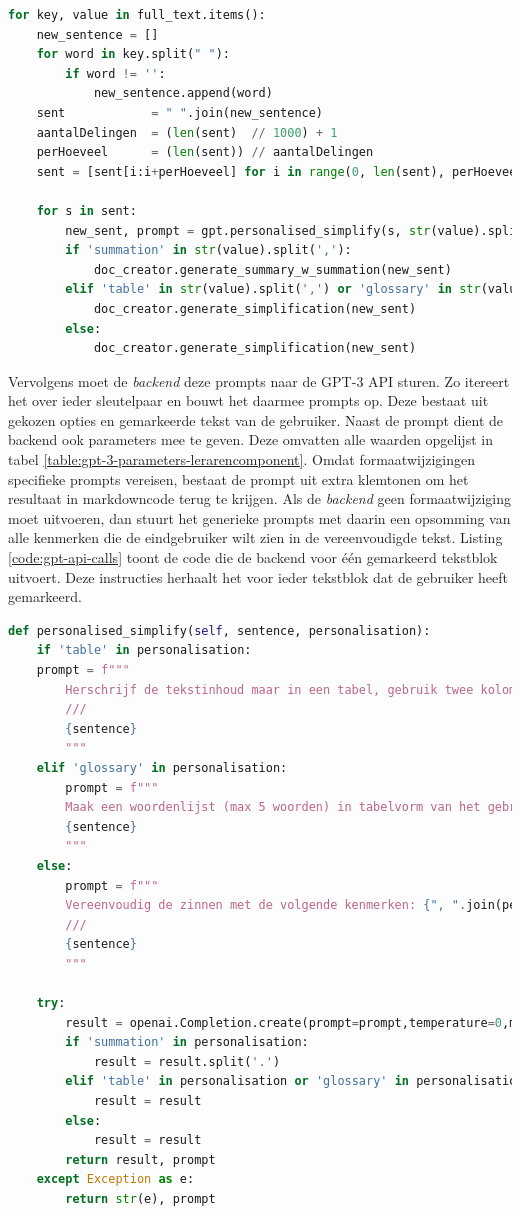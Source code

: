 \begin{lstlisting}[language=Python, caption={Alle gemarkeerde tekstblokken uit de localstorage aflopen en doorsturen naar het markdown document.}, label={code:localstorage-iteration}]
for key, value in full_text.items():
	new_sentence = []
	for word in key.split(" "):
		if word != '':
			new_sentence.append(word)
	sent            = " ".join(new_sentence)
	aantalDelingen  = (len(sent)  // 1000) + 1
	perHoeveel      = (len(sent)) // aantalDelingen
	sent = [sent[i:i+perHoeveel] for i in range(0, len(sent), perHoeveel)]
	
	for s in sent:
		new_sent, prompt = gpt.personalised_simplify(s, str(value).split(','))
		if 'summation' in str(value).split(','):
			doc_creator.generate_summary_w_summation(new_sent)
		elif 'table' in str(value).split(',') or 'glossary' in str(value).split(','):
			doc_creator.generate_simplification(new_sent)
		else:
			doc_creator.generate_simplification(new_sent)
\end{lstlisting}

Vervolgens moet de \textit{backend} deze prompts naar de GPT-3 API sturen. Zo itereert het over ieder sleutelpaar en bouwt het daarmee prompts op. Deze bestaat uit gekozen opties en gemarkeerde tekst van de gebruiker. Naast de prompt dient de backend ook parameters mee te geven. Deze omvatten alle waarden opgelijst in tabel \ref{table:gpt-3-parameters-lerarencomponent}. Omdat formaatwijzigingen specifieke prompts vereisen, bestaat de prompt uit extra klemtonen om het resultaat in markdowncode terug te krijgen. Als de \textit{backend} geen formaatwijziging moet uitvoeren, dan stuurt het generieke prompts met daarin een opsomming van alle kenmerken die de eindgebruiker wilt zien in de vereenvoudigde tekst. Listing \ref{code:gpt-api-calls} toont de code die de backend voor één gemarkeerd tekstblok uitvoert. Deze instructies herhaalt het voor ieder tekstblok dat de gebruiker heeft gemarkeerd.

\begin{lstlisting}[language=Python, caption={API-calls versturen naar de GPT-3 API.}, label={code:gpt-api-calls}]
def personalised_simplify(self, sentence, personalisation):
	if 'table' in personalisation:
	prompt = f"""
		Herschrijf de tekstinhoud maar in een tabel, gebruik twee kolommen naar keuze; schrijf dit in markdowncode.
		///
		{sentence}
		"""
	elif 'glossary' in personalisation:
		prompt = f"""
		Maak een woordenlijst (max 5 woorden) in tabelvorm van het gebruikte jargon uit deze tekst; schrijf dit in markdowncode. ///
		{sentence}
		"""
	else:
		prompt = f"""
		Vereenvoudig de zinnen met de volgende kenmerken: {", ".join(personalisation)}
		///
		{sentence}
		"""
	
	try:
		result = openai.Completion.create(prompt=prompt,temperature=0,max_tokens=len(prompt),model=COMPLETIONS_MODEL,top_p=0.9,stream=False)["choices"][0]["text"].strip(" \n")
		if 'summation' in personalisation:
			result = result.split('.')
		elif 'table' in personalisation or 'glossary' in personalisation:
			result = result
		else:
			result = result
		return result, prompt
	except Exception as e:
		return str(e), prompt
\end{lstlisting}

